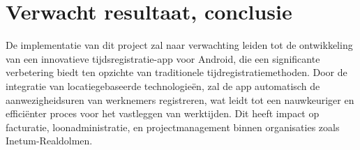 \section{Verwacht resultaat, conclusie}%
\label{sec:verwachte_resultaten}




De implementatie van dit project zal naar verwachting leiden tot de ontwikkeling van een innovatieve tijdsregistratie-app voor Android, die een significante verbetering biedt ten opzichte van traditionele tijdregistratiemethoden. Door de integratie van locatiegebaseerde technologieën, zal de app automatisch de aanwezigheidsuren van werknemers registreren, wat leidt tot een nauwkeuriger en efficiënter proces voor het vastleggen van werktijden. Dit heeft impact op facturatie, loonadministratie, en projectmanagement binnen organisaties zoals Inetum-Realdolmen.